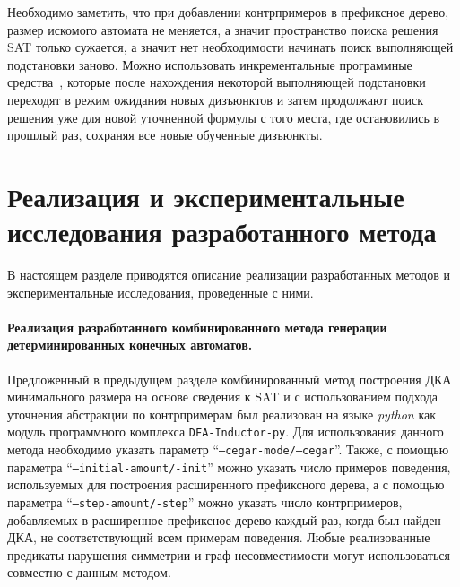 Необходимо заметить, что при добавлении контрпримеров в префиксное дерево, размер искомого автомата не меняется, а значит пространство поиска решения SAT только сужается, а значит нет необходимости начинать поиск выполняющей подстановки заново.
Можно использовать инкрементальные программные средства~\cite{DBLP:conf/sat/EenS03}, которые после нахождения некоторой выполняющей подстановки переходят в режим ожидания новых дизъюнктов и затем продолжают поиск решения уже для новой уточненной формулы с того места, где остановились в прошлый раз, сохраняя все новые обученные дизъюнкты.


\section{Реализация и экспериментальные исследования разработанного метода}
\label{sec:cegar:results}

В настоящем разделе приводятся описание реализации разработанных методов и экспериментальные исследования, проведенные с ними.


\paragraph*{Реализация разработанного комбинированного метода генерации детерминированных конечных автоматов.}
\label{sec:cegar:results:impl}

Предложенный в предыдущем разделе комбинированный метод построения ДКА минимального размера на основе сведения к SAT и с использованием подхода уточнения абстракции по контрпримерам был реализован на языке \emph{python} как модуль программного комплекса \texttt{DFA-Inductor-py}.
Для использования данного метода необходимо указать параметр ``\texttt{--cegar-mode/--cegar}''.
Также, с помощью параметра ``\texttt{--initial-amount/-init}'' можно указать число примеров поведения, используемых для построения расширенного префиксного дерева, а с помощью параметра ``\texttt{--step-amount/-step}'' можно указать число контрпримеров, добавляемых в расширенное префиксное дерево каждый раз, когда был найден ДКА, не соответствующий всем примерам поведения.
Любые реализованные предикаты нарушения симметрии и граф несовместимости могут использоваться совместно с данным методом.

